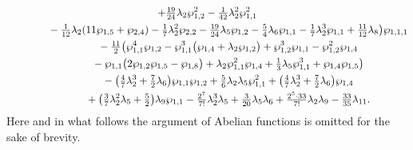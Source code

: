 \documentclass[pdftex]{sigma}
\numberwithin{equation}{section}
\begin{document}
\begin{gather*}
 + \tfrac{19}{24} \lambda_2 \wp_{1,2}^2 - \tfrac{1}{42} \lambda_2^2 \wp_{1,1}^2\\
\hphantom{\mathcal{P}_{11}(u) =}{} -\tfrac{1}{12} \lambda_2 (11\wp_{1,5} + \wp_{2,4}) - \tfrac{1}{7} \lambda_2^2 \wp_{2,2} -\tfrac{19}{24} \lambda_5 \wp_{1,2} -\tfrac{5}{4} \lambda_6 \wp_{1,1}
 - \tfrac{1}{7} \lambda_2^3 \wp_{1,1} +\tfrac{11}{12} \lambda_8 \big)\wp_{1,1,1}\\
\hphantom{\mathcal{P}_{11}(u) =}{} - \tfrac{11}{2} \big(\wp_{1,1}^4 \wp_{1,2}- \wp_{1,1}^3 \big(\wp_{1,4} + \lambda_2 \wp_{1,2}\big) + \wp_{1,2}^3 \wp_{1,1}- \wp_{1,2}^2 \wp_{1,4}\\
\hphantom{\mathcal{P}_{11}(u) =}{}- \wp_{1,1} \big(2 \wp_{1,2} \wp_{1,5} - \wp_{1,8}\big)
 + \lambda_2 \wp_{1,1}^2 \wp_{1,4} + \tfrac{1}{3} \lambda_5 \wp_{1,1}^3 + \wp_{1,4} \wp_{1,5} \big)\\
 \hphantom{\mathcal{P}_{11}(u) =}{}
 - \big(\tfrac{4}{7} \lambda_2^3 + \tfrac{7}{2} \lambda_6\big) \wp_{1,1} \wp_{1,2} + \tfrac{5}{6} \lambda_2 \lambda_5 \wp_{1,1}^2 + \big(\tfrac{4}{7} \lambda_2^3 + \tfrac{7}{2} \lambda_6\big) \wp_{1,4}\\
 \hphantom{\mathcal{P}_{11}(u) =}{}
 + \big(\tfrac{3}{7} \lambda_2^2 \lambda_5 + \tfrac{5}{2} \big) \lambda_9 \wp_{1,1}
 - \tfrac{2^7}{7!} \lambda_2^3 \lambda_5 + \tfrac{3}{20} \lambda_5 \lambda_6 + \tfrac{2^5\cdot 33}{7!} \lambda_2 \lambda_9 - \tfrac{33}{35} \lambda_{11}.
\end{gather*}
Here and in what follows the argument of Abelian functions is omitted for the sake of brevity.
\end{document}
